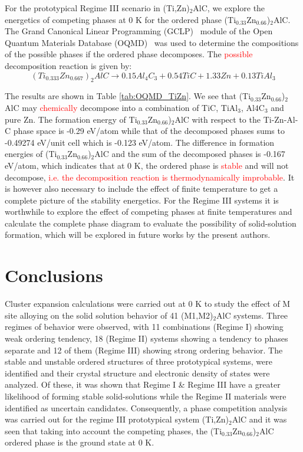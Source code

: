 \documentclass[preprint,amsmath,amssymb,aps, prb,showkeys]{revtex4-1}
\begin{document}
For the prototypical Regime III scenario in (Ti,Zn)$_2$AlC, we explore the energetics of competing phases at 0 K for the ordered phase (Ti$_{0.33}$Zn$_0.66$)$_2$AlC. The Grand Canonical Linear Programming (GCLP)~\cite{r2007first,kirklin2013high} module of the Open Quantum Materials Database (OQMD)~\cite{saal2013materials} was used to determine the compositions of the possible phases if the ordered phase decomposes. The \textcolor{red}{possible} decomposition reaction is given by:
\begin{equation}
(Ti_{0.333}Zn_{0.667})_2AlC \rightarrow 0.15 Al_4C_3 + 0.54 TiC + 1.33 Zn + 0.13 TiAl_3
\end{equation}

The results are shown in Table \ref{tab:OQMD_TiZn}. We see that (Ti$_{0.33}$Zn$_0.66$)$_2$AlC may \textcolor{red}{chemically} decompose into a combination of TiC, TiAl$_3$, Al$4$C$_3$ and pure Zn. The formation energy of Ti$_{0.33}$Zn$_0.66$)$_2$AlC with respect to the Ti-Zn-Al-C phase space is -0.29 eV/atom while that of the decomposed phases sums to -0.49274 eV/unit cell which is -0.123 eV/atom. The difference in formation energies of (Ti$_{0.33}$Zn$_0.66$)$_2$AlC and the sum of the decomposed phases is -0.167 eV/atom, which indicates that at 0 K, the ordered phase is  \textcolor{red}{stable} and will not decompose,  \textcolor{red}{i.e. the decomposition reaction is thermodynamically improbable}. 
It is however also necessary to include the effect of finite temperature to get a complete picture of the stability energetics. For the Regime III systems it is worthwhile to explore the effect of competing phases at finite temperatures and calculate the complete phase diagram to evaluate the possibility of solid-solution formation, which will be explored in future works by the present authors. 
\section{Conclusions}
\label{sec:conclusion}
Cluster expansion calculations were carried out at 0 K to study the effect of M site alloying on the solid solution behavior of 41 (M1,M2)$_2$AlC systems. Three regimes of behavior were observed, with 11 combinations (Regime I) showing weak ordering tendency, 18 (Regime II) systems showing a tendency to phases separate and 12  of them  (Regime III) showing strong ordering behavior. The stable and unstable ordered structures of three prototypical systems, were identified and their crystal structure and electronic density of states were analyzed. Of these, it was shown that Regime I \& Regime III have a greater likelihood of forming stable solid-solutions while the Regime II materials were identified as uncertain candidates. Consequently, a phase competition analysis was carried out for the regime III prototypical system (Ti,Zn)$_2$AlC and it was seen that taking into account the competing phases, the (Ti$_{0.33}$Zn$_0.66$)$_2$AlC ordered phase is the ground state at 0 K. 
\end{document}
